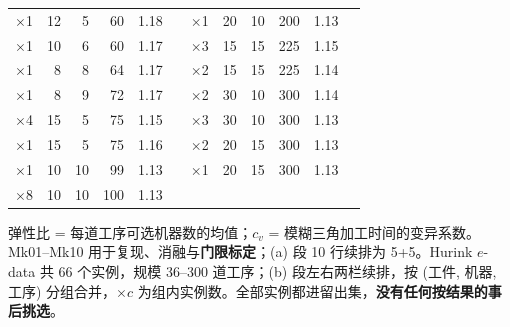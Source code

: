 \begin{table}[htbp]
{\begin{tabular}{lrrrrr@{\hspace{10pt}}lrrrrr}
    $\times$1 & 12 & 5 & 60 & 1.18 & & $\times$1 & 20 & 10 & 200 & 1.13 & \\
    $\times$1 & 10 & 6 & 60 & 1.17 & & $\times$3 & 15 & 15 & 225 & 1.15 & \\
    $\times$1 & 8 & 8 & 64 & 1.17 & & $\times$2 & 15 & 15 & 225 & 1.14 & \\
    $\times$1 & 8 & 9 & 72 & 1.17 & & $\times$2 & 30 & 10 & 300 & 1.14 & \\
    $\times$4 & 15 & 5 & 75 & 1.15 & & $\times$3 & 30 & 10 & 300 & 1.13 & \\
    $\times$1 & 15 & 5 & 75 & 1.16 & & $\times$2 & 20 & 15 & 300 & 1.13 & \\
    $\times$1 & 10 & 10 & 99 & 1.13 & & $\times$1 & 20 & 15 & 300 & 1.13 & \\
    $\times$8 & 10 & 10 & 100 & 1.13 & &  &  &  &  &  &  \\
    \bottomrule
  \end{tabular}
  }
  \par\vspace{3pt}\footnotesize\begin{minipage}{\linewidth}弹性比 = 每道工序可选机器数的均值；$c_v$ = 模糊三角加工时间的变异系数。Mk01--Mk10 用于复现、消融与\textbf{门限标定}；(a) 段 10 行续排为 5+5。Hurink $e$-data 共 66 个实例，规模 36--300 道工序；(b) 段左右两栏续排，按 (工件, 机器, 工序) 分组合并，$\times c$ 为组内实例数。全部实例都进留出集，\textbf{没有任何按结果的事后挑选}。\end{minipage}
\end{table}
